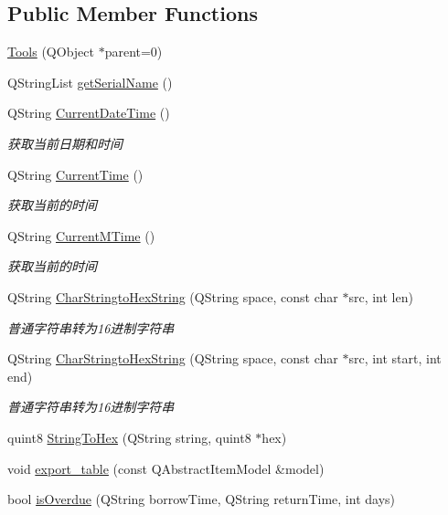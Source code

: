 \subsection*{Public Member Functions}
\begin{DoxyCompactItemize}
\item 
\mbox{\hyperlink{class_tools_a812eaff6fdce0fe489279f72c06e83e3}{Tools}} (Q\+Object $\ast$parent=0)
\item 
Q\+String\+List \mbox{\hyperlink{class_tools_ac18eb440bd7a33e8e242df2cc4d4d4bc}{get\+Serial\+Name}} ()
\item 
Q\+String \mbox{\hyperlink{class_tools_a438ea9326a6ae735d51bc3508c430a3b}{Current\+Date\+Time}} ()
\begin{DoxyCompactList}\small\item\em 获取当前日期和时间 \end{DoxyCompactList}\item 
Q\+String \mbox{\hyperlink{class_tools_af10c90501143838d9af896a60026668d}{Current\+Time}} ()
\begin{DoxyCompactList}\small\item\em 获取当前的时间 \end{DoxyCompactList}\item 
Q\+String \mbox{\hyperlink{class_tools_a70173de28152ff05b140b9895de99e20}{Current\+M\+Time}} ()
\begin{DoxyCompactList}\small\item\em 获取当前的时间 \end{DoxyCompactList}\item 
Q\+String \mbox{\hyperlink{class_tools_a89da3511a27330d893d495ddc6160a91}{Char\+Stringto\+Hex\+String}} (Q\+String space, const char $\ast$src, int len)
\begin{DoxyCompactList}\small\item\em 普通字符串转为16进制字符串 \end{DoxyCompactList}\item 
Q\+String \mbox{\hyperlink{class_tools_ae4c5caed900acc0c2ca436929a753dff}{Char\+Stringto\+Hex\+String}} (Q\+String space, const char $\ast$src, int start, int end)
\begin{DoxyCompactList}\small\item\em 普通字符串转为16进制字符串 \end{DoxyCompactList}\item 
quint8 \mbox{\hyperlink{class_tools_a724c823ede8cd11880888f64b1a3c4df}{String\+To\+Hex}} (Q\+String string, quint8 $\ast$hex)
\item 
void \mbox{\hyperlink{class_tools_af6c4eaadfb21ee231cbc4d6384250629}{export\+\_\+table}} (const Q\+Abstract\+Item\+Model \&model)
\item 
bool \mbox{\hyperlink{class_tools_a178182aebac5d407b60720335c04822a}{is\+Overdue}} (Q\+String borrow\+Time, Q\+String return\+Time, int days)
\end{DoxyCompactItemize}
